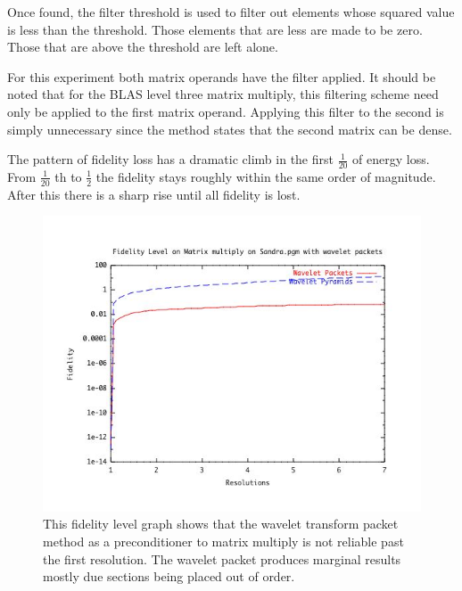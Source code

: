 Once found, the filter threshold is used to filter out elements whose squared value is less than the threshold.  Those elements that are less are made to be zero.   Those that are above the threshold are left alone.  

For this experiment both matrix operands have the filter applied.  It should be noted that for the BLAS level three matrix multiply, this filtering scheme need only be applied to the first matrix operand.   Applying this filter to the second is simply unnecessary since the method states that the second matrix can be dense.  

The pattern of fidelity loss has a dramatic climb in the first $\frac{1}{20}$ of energy loss.  From $\frac{1}{20}$ th to $\frac{1}{2}$ the fidelity stays roughly within the same order of magnitude.  After this there is a sharp rise until all fidelity is lost.  

\begin{figure}
\includegraphics [width=7in]{sandrapyrpackresults.jpg}
\caption{This fidelity level graph shows that the wavelet transform packet method as a preconditioner to matrix multiply is not reliable past the first resolution. The wavelet packet produces marginal results mostly due sections being placed out of order.}
\label{packetresultsstraight}
\end{figure}






